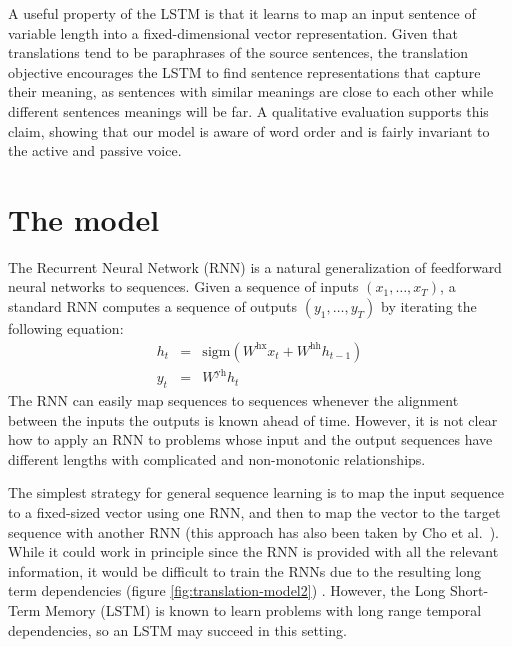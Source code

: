 \documentclass{article} \usepackage{nips14submit_e}
\begin{document}
A useful property of the LSTM is that it learns to map an input
sentence of variable length into a fixed-dimensional vector
representation.  Given that translations tend to be paraphrases of the
source sentences, the translation objective encourages the LSTM to
find sentence representations that capture their meaning, as sentences
with similar meanings are close to each other while different
sentences meanings will be far. A qualitative evaluation supports
this claim, showing that our model is aware of word order and is
fairly invariant to the active and passive voice.

 

\section{The model}
\label{sec:model}

The Recurrent Neural Network (RNN) \cite{werbos,rumelhart1986learning}
is a natural generalization of feedforward neural networks to
sequences.  Given a sequence of inputs $(x_1,\ldots,x_T)$, a
standard RNN computes a sequence of outputs $(y_1,\ldots,y_T)$ by
iterating the following equation: 
\begin{eqnarray*}
h_t &=& \mathrm{sigm}\left(W^{\mathrm{hx}} x_t + W^{\mathrm{hh}} h_{t-1}\right) \\
y_t &=& W^{\mathrm{yh}}h_t
\end{eqnarray*}
The RNN can easily map sequences to sequences whenever the alignment
between the inputs the outputs is known ahead of time. However, it is
not clear how to apply an RNN to problems whose input and the output
sequences have different lengths with complicated and non-monotonic
relationships.

The simplest strategy for general sequence learning is to map the input
sequence to a fixed-sized vector using one RNN, and then to map the
vector to the target sequence with another RNN (this approach has also been
taken by Cho et al.~\cite{cho14}).  While it could work
in principle since the RNN is provided with all the relevant
information, it would be difficult to train the RNNs due to the
resulting long term dependencies
(figure \ref{fig:translation-model2})
\cite{hochreiter_long_term,bengio_long_term,hochreiter97,Hochreiter01gradientflow}. However, the Long
Short-Term Memory (LSTM) \cite{hochreiter97} is known to learn
problems with long range temporal dependencies, so an LSTM may succeed
in this setting.
\end{document}
